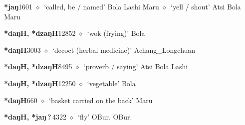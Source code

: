   \begin{list}{}{\leftmargin=1.5em \itemindent=-1.5em}
  \item {\footnotesize \textbf{*jaŋ}}{\tiny 1601}
         $\diamond$~`called, be / named'
         Bola 
\hspace{1ex}
         Lashi 
\hspace{1ex}
         Maru 
\hspace{1ex}
         $\diamond$~`yell / shout'
         Atsi 
\hspace{1ex}
         Bola 
\hspace{1ex}
         Maru 
  \item {\footnotesize \textbf{*daŋH, *dzaŋH}}{\tiny 12852}
\hspace{1ex}
         $\diamond$~`wok (frying)'
         Bola 
  \item {\footnotesize \textbf{*daŋH}}{\tiny 3003}
\hspace{1ex}
         $\diamond$~`decoct (herbal medicine)'
         Achang\_Longchuan 
  \item {\footnotesize \textbf{*daŋH, *dzaŋH}}{\tiny 8495}
\hspace{1ex}
         $\diamond$~`proverb / saying'
         Atsi 
\hspace{1ex}
         Bola 
\hspace{1ex}
         Lashi 
  \item {\footnotesize \textbf{*daŋH, *dzaŋH}}{\tiny 12250}
\hspace{1ex}
         $\diamond$~`vegetable'
         Bola 
  \item {\footnotesize \textbf{*daŋH}}{\tiny 660}
\hspace{1ex}
         $\diamond$~`basket carried on the back'
         Maru 
  \item {\footnotesize \textbf{*daŋH, *jaŋ\,?\,}}{\tiny 4322}
\hspace{1ex}
         $\diamond$~`fly'
         OBur. 
\hspace{1ex}
         OBur. 

\end{list}
